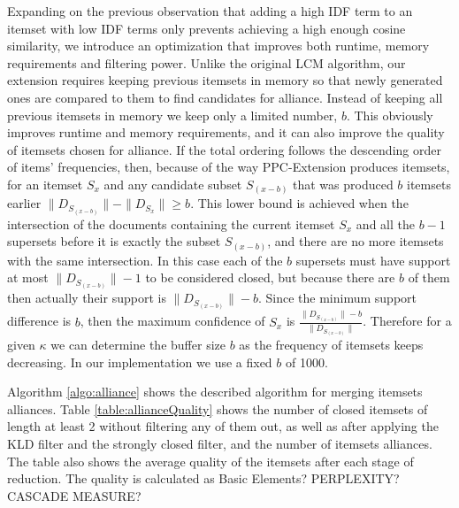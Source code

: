 \documentclass{sig-alternate}
\begin{document}
Expanding on the previous observation that adding a high IDF term to an itemset with low IDF terms only prevents achieving a high enough cosine similarity, we introduce an optimization that improves both runtime, memory requirements and filtering power. Unlike the original LCM algorithm, our extension requires keeping previous itemsets in memory so that newly generated ones are compared to them to find candidates for alliance. Instead of keeping all previous itemsets in memory we keep only a limited number, $b$. This obviously improves runtime and memory requirements, and it can also improve the quality of itemsets chosen for alliance. If the total ordering follows the descending order of items' frequencies, then, because of the way PPC-Extension produces itemsets, for an itemset $S_x$ and any candidate subset $S_{(x-b)}$ that was produced $b$ itemsets earlier $\|D_{S_{(x-b)}}\| - \|D_{S_x}\| \ge b$. This lower bound is achieved when the intersection of the documents containing the current itemset $S_x$ and all the $b-1$ supersets before it is exactly the subset $S_{(x-b)}$, and there are no more itemsets with the same intersection. In this case each of the $b$ supersets must have support at most $\|D_{S_{(x-b)}}\| - 1$ to be considered closed, but because there are $b$ of them then actually their support is $\|D_{S_{(x-b)}}\| - b$. Since the minimum support difference is $b$, then the maximum confidence of $S_x$ is $\frac{\|D_{S_{(x-b)}}\| - b}{\|D_{S_{(x-b)}}\|} $. Therefore for a given $\kappa$ we can determine the buffer size $b$ as the frequency of itemsets keeps decreasing. In our implementation we use a fixed $b$ of 1000.


Algorithm \ref{algo:alliance} shows the described algorithm for merging itemsets alliances. Table  \ref{table:allianceQuality} shows the number of closed itemsets of length at least 2 without filtering any of them out, as well as after applying the KLD filter and the strongly closed filter, and the number of itemsets alliances. The table also shows the average quality of the itemsets after each stage of reduction. The quality is calculated as Basic Elements? PERPLEXITY? CASCADE MEASURE? 
\end{document}

